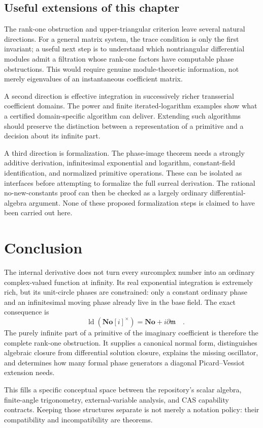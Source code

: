 \documentclass[11pt,a4paper]{article}
\numberwithin{equation}{section}
\theoremstyle{definition}
\theoremstyle{remark}
\newcommand{\No}{\mathbf{No}}
\newcommand{\mm}{\mathfrak m}
\newcommand{\D}{\partial}
\newcommand{\ld}{\operatorname{ld}}
\begin{document}
\subsection{Useful extensions of this chapter}
The rank-one obstruction and upper-triangular criterion leave several
natural directions. For a general matrix system, the trace condition is
only the first invariant; a useful next step is to understand which
nontriangular differential modules admit a filtration whose rank-one
factors have computable phase obstructions. This would require genuine
module-theoretic information, not merely eigenvalues of an instantaneous
coefficient matrix.

A second direction is effective integration in successively richer
transserial coefficient domains. The power and finite iterated-logarithm
examples show what a certified domain-specific algorithm can deliver.
Extending such algorithms should preserve the distinction between a
representation of a primitive and a decision about its infinite part.

A third direction is formalization. The phase-image theorem needs a
strongly additive derivation, infinitesimal exponential and logarithm,
constant-field identification, and normalized primitive operations. These
can be isolated as interfaces before attempting to formalize the full
surreal derivation. The rational no-new-constants proof can then be checked
as a largely ordinary differential-algebra argument. None of these proposed
formalization steps is claimed to have been carried out here.

\section{Conclusion}
The internal derivative does not turn every surcomplex number into an
ordinary complex-valued function at infinity. Its real exponential
integration is extremely rich, but its unit-circle phases are constrained:
only a constant ordinary phase and an infinitesimal moving phase already
live in the base field. The exact consequence is
\[
 \boxed{\quad\ld(\No[i]^{\times})=\No+i\D\mm\quad}.
\]
The purely infinite part of a primitive of the imaginary coefficient is
therefore the complete rank-one obstruction. It supplies a canonical
normal form, distinguishes algebraic closure from differential solution
closure, explains the missing oscillator, and determines how many formal
phase generators a diagonal Picard--Vessiot extension needs.

This fills a specific conceptual space between the repository's scalar
algebra, finite-angle trigonometry, external-variable analysis, and CAS
capability contracts. Keeping those structures separate is not merely a
notation policy: their compatibility and incompatibility are theorems.
\end{document}
